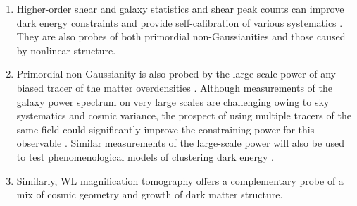 \begin{enumerate}
\item Higher-order shear and galaxy statistics and shear peak counts can improve dark energy
constraints and provide self-calibration of various systematics
\citep{2004MNRAS.348..897T,2006MNRAS.366..884D,2006MNRAS.366..101H,2016PhRvD..94f3534P}. They are also probes of both
primordial non-Gaussianities and those caused by nonlinear structure.

\item Primordial non-Gaussianity is also probed by the large-scale power of any biased tracer of the matter
overdensities \citep{2008PhRvD..77l3514D}. Although measurements of the galaxy power spectrum on very large scales
are challenging owing to sky systematics \citep{2014PhRvL.113v1301L} and cosmic variance, the prospect of using
multiple tracers of the same field could significantly improve the constraining power for this observable
\citep{2009PhRvL.102b1302S}. Similar measurements of the large-scale power will also be used to test phenomenological
models of clustering dark energy \citep{2006PhRvD..74d3505T}.

\item Similarly, WL magnification tomography \citep{2012MNRAS.426.2489M} offers a
complementary probe of a mix of cosmic geometry and growth of dark matter structure.


\end{enumerate}
